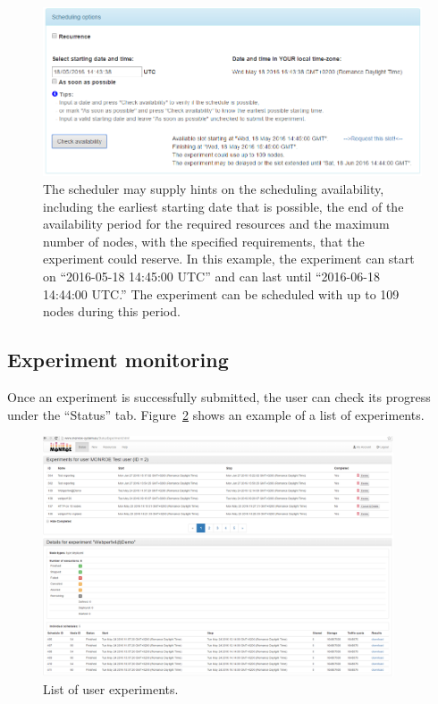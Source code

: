 \documentclass[a4paper,10pt]{article}
\begin{document}
\begin{figure}[tp]
	\centering
	\includegraphics[width=1.0\textwidth]{NewExperimentCheckAvailability.png}
	\caption{The scheduler may supply hints on the scheduling availability, including the earliest starting date that is possible, the end of the availability period for the required resources and the maximum number of nodes, with the specified requirements, that the experiment could reserve. In this example, the experiment can start on ``2016-05-18 14:45:00 UTC'' and can last until ``2016-06-18 14:44:00 UTC.'' The experiment can be scheduled with up to 109 nodes during this period.}
	\label{fig:newExperimentCheckAvailability}
\end{figure}


\subsection{Experiment monitoring}
\label{subsec:experimentMonitoring}

Once an experiment is successfully submitted, the user can check its progress under the ``Status'' tab.
Figure~\ref{fig:ExperimentsSummary} shows an example of a list of experiments.

\begin{figure}[tp]
	\centering
	\includegraphics[width=0.925\textwidth]{ExperimentSummary.png}
	\caption{List of user experiments.}
	\label{fig:ExperimentsSummary}
\end{figure}
\end{document}
